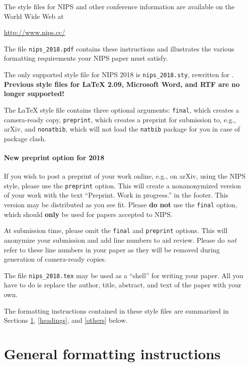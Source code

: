 \documentclass{article}
\begin{document}
The style files for NIPS and other conference information are
available on the World Wide Web at
\begin{center}
  \url{http://www.nips.cc/}
\end{center}
The file \verb+nips_2018.pdf+ contains these instructions and
illustrates the various formatting requirements your NIPS paper must
satisfy.

The only supported style file for NIPS 2018 is \verb+nips_2018.sty+,
rewritten for \LaTeXe{}.  \textbf{Previous style files for \LaTeX{}
  2.09, Microsoft Word, and RTF are no longer supported!}

The \LaTeX{} style file contains three optional arguments: \verb+final+,
which creates a camera-ready copy, \verb+preprint+, which creates a
preprint for submission to, e.g., arXiv, and \verb+nonatbib+, which will
not load the \verb+natbib+ package for you in case of package clash.

\paragraph{New preprint option for 2018}
If you wish to post a preprint of your work online, e.g., on arXiv,
using the NIPS style, please use the \verb+preprint+ option. This will
create a nonanonymized version of your work with the text
``Preprint. Work in progress.''  in the footer. This version may be
distributed as you see fit. Please \textbf{do not} use the
\verb+final+ option, which should \textbf{only} be used for papers
accepted to NIPS.

At submission time, please omit the \verb+final+ and \verb+preprint+
options. This will anonymize your submission and add line numbers to aid
review. Please do \emph{not} refer to these line numbers in your paper
as they will be removed during generation of camera-ready copies.

The file \verb+nips_2018.tex+ may be used as a ``shell'' for writing
your paper. All you have to do is replace the author, title, abstract,
and text of the paper with your own.

The formatting instructions contained in these style files are
summarized in Sections \ref{gen_inst}, \ref{headings}, and
\ref{others} below.

\section{General formatting instructions}
\label{gen_inst}
\end{document}
